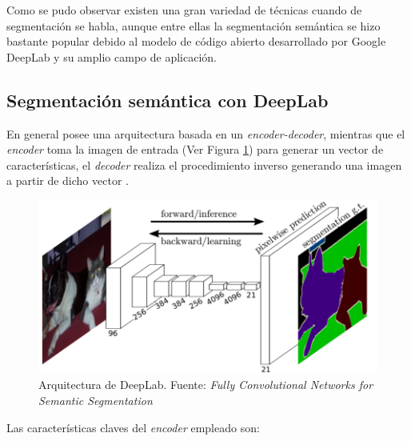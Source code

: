 Como se pudo observar existen una gran variedad de técnicas cuando de segmentación se habla, aunque entre ellas la segmentación semántica se hizo bastante popular debido al modelo de código abierto desarrollado por Google DeepLab y su amplio campo de aplicación.
\subsection{Segmentación semántica con DeepLab}
En general posee una arquitectura basada en un \textit{encoder-decoder}, mientras que el \textit{encoder} toma la imagen de entrada (Ver Figura \ref{encoder_decoder}) para generar un vector de características, el \textit{decoder} realiza el procedimiento inverso generando una imagen a partir de dicho vector \cite[p~220]{Krishnendu}. 
\begin{figure}[H]
    \centering
    \includegraphics[scale=0.6]{Recursos/encoder_decoder.png}
    \caption[Arquitectura de DeepLab.]{Arquitectura de DeepLab. {\footnotesize Fuente: \textit{Fully Convolutional Networks for Semantic Segmentation} \cite{fullyConectedNet}}}
    \label{encoder_decoder}
\end{figure}
Las características claves del \textit{encoder} empleado son:
